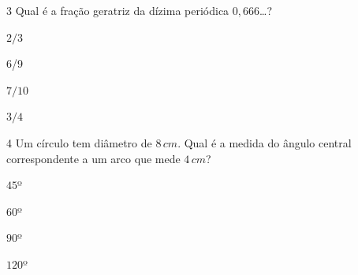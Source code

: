 \num{3} Qual é a fração geratriz da dízima periódica $0,666$\ldots?

\begin{escolha}
\item $2/3$
\item $6$/9
\item $7/10$
\item $3/4$
\end{escolha}



\num{4}  Um círculo tem diâmetro de $8\,cm$. Qual é a medida do ângulo central
correspondente a um arco que mede $4\,cm$?

\begin{escolha}
\item $45$º
\item $60$º
\item $90$º
\item $120$º
\end{escolha}



